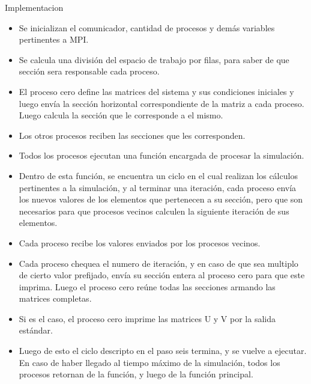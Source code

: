 \begin{section}{Implementacion}
\begin{itemize}
\item Se inicializan el comunicador, cantidad de procesos y demás variables pertinentes a MPI.
\item Se calcula una división del espacio de trabajo por filas, para saber de que sección sera responsable cada proceso.
\item El proceso cero define las matrices del sistema y sus condiciones iniciales y luego envía la sección horizontal correspondiente de la matriz a cada proceso. Luego calcula la sección que le corresponde a el mismo.
\item Los otros procesos reciben las secciones que les corresponden.
\item Todos los procesos ejecutan una función encargada de procesar la simulación.
\item Dentro de esta función, se encuentra un ciclo en el cual realizan los cálculos pertinentes a la simulación, y al terminar una iteración, cada proceso envía los nuevos valores de los elementos que pertenecen a su sección, pero que son necesarios para que procesos vecinos calculen la siguiente iteración de sus elementos.
\item Cada proceso recibe los valores enviados por los procesos vecinos.
\item Cada proceso chequea el numero de iteración, y en caso de que sea multiplo de cierto valor prefijado, envía su sección entera al proceso cero para que este imprima. Luego el proceso cero reúne todas las secciones armando las matrices completas.
\item Si es el caso, el proceso cero imprime las matrices U y V por la salida estándar.
\item Luego de esto el ciclo descripto en el paso seis termina, y se vuelve a ejecutar. En caso de haber llegado al tiempo máximo de la simulación, todos los procesos retornan de la función, y luego de la función principal.
~\\
~\\


\end{itemize}
\end{section}
